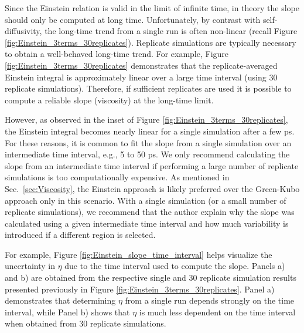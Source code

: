 \documentclass[9pt,bestpractices]{livecoms}
\begin{document}
Since the Einstein relation is valid in the limit of infinite time, in theory the slope should only be computed at long time. Unfortunately, by contrast with self-diffusivity, the long-time trend from a single run is often non-linear (recall Figure \ref{fig:Einstein_3terms_30replicates}). Replicate simulations are typically necessary to obtain a well-behaved long-time trend. For example, Figure \ref{fig:Einstein_3terms_30replicates} demonstrates that the replicate-averaged Einstein integral is approximately linear over a large time interval (using 30 replicate simulations). Therefore, if sufficient replicates are used it is possible to compute a reliable slope (viscosity) at the long-time limit.

However, as observed in the inset of Figure \ref{fig:Einstein_3terms_30replicates}, the Einstein integral becomes nearly linear for a single simulation after a few ps. For these reasons, it is common to fit the slope from a single simulation over an intermediate time interval, e.g., 5 to 50 ps. We only recommend calculating the slope from an intermediate time interval if performing a large number of replicate simulations is too computationally expensive. As mentioned in Sec.\ \ref{sec:Viscosity}, the Einstein approach is likely preferred over the Green-Kubo approach only in this scenario. With a single simulation (or a small number of replicate simulations), we recommend that the author explain why the slope was calculated using a given intermediate time interval and how much variability is introduced if a different region is selected. 

For example, Figure \ref{fig:Einstein_slope_time_interval} helps visualize the uncertainty in $\eta$ due to the time interval used to compute the slope. Panels a) and b) are obtained from the respective single and 30 replicate simulation results presented previously in Figure \ref{fig:Einstein_3terms_30replicates}. Panel a) demonstrates that determining $\eta$ from a single run depends strongly on the time interval, while Panel b) shows that $\eta$ is much less dependent on the time interval when obtained from 30 replicate simulations.
\end{document}
